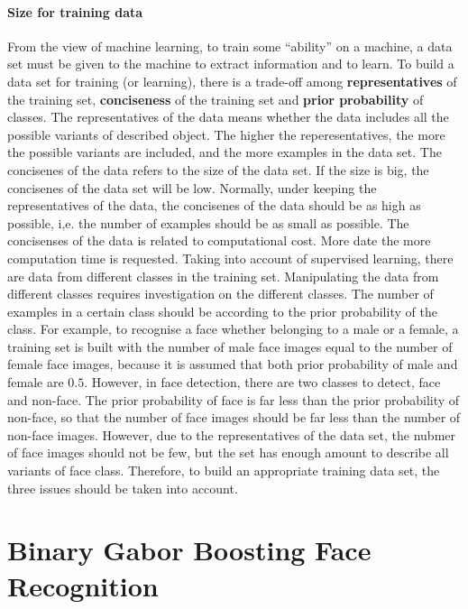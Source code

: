 \paragraph{Size for training data}
From the view of machine learning, to train some ``ability'' on a machine, a data set must be given to the machine to extract information and to learn. To build a data set for training (or learning), there is a trade-off among \textbf{representatives} of the training set, \textbf{conciseness} of the training set and  \textbf{prior probability} of classes. The representatives of the data means whether the data includes all the possible variants of described object. The higher the reperesentatives, the more the possible variants are included, and the more examples in the data set. The concisenes of the data refers to the size of the data set. If the size is big, the concisenes of the data set will be low. Normally, under keeping the representatives of the data, the concisenes of the data should be as high as possible, i,e. the number of examples should be as small as possible. The concisenses of the data is related to computational cost. More date the more computation time is requested. Taking into account of supervised learning, there are data from different classes in the training set. Manipulating the data from different classes requires investigation on the different classes. The number of examples in a certain class should be according to the prior probability of the class. For example, to recognise a face whether belonging to a male or a female, a training set is built with the number of male face images equal to the number of female face images, because it is assumed that both prior probability of male and female are $0.5$. However, in face detection, there are two classes to detect, face and non-face. The prior probability of face is far less than the prior probability of non-face, so that the number of face images should be far less than the number of non-face images. However, due to the representatives of the data set, the nubmer of face images should not be few, but the set has enough amount to describe all variants of face class. Therefore, to build an appropriate training data set, the three issues should be taken into account.

\section{Binary Gabor Boosting Face Recognition}
